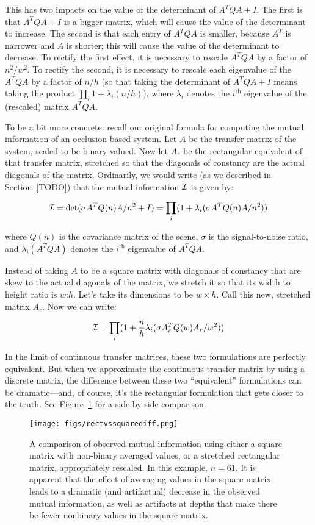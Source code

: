 This has two impacts on the value of the determinant of $A^T Q A + I$. The first is that $A^T Q A + I$ is a bigger matrix, which will cause the value of the determinant to increase. The second is that each entry of $A^T Q A$ is smaller, because $A^T$ is narrower and $A$ is shorter; this will cause the value of the determinant to decrease. To rectify the first effect, it is necessary to rescale $A^T Q A$ by a factor of $n^2/w^2$. To rectify the second, it is necessary to rescale each eigenvalue of the $A^T Q A$ by a factor of $n/h$ (so that taking the determinant of $A^T Q A + I$ means taking the product $\prod_i 1 + \lambda_i (n/h)$), where $\lambda_i$ denotes the $i^{\textrm{th}}$ eigenvalue of the (rescaled) matrix $A^T Q A$.

To be a bit more concrete: recall our original formula for computing the mutual information of an occlusion-based system. Let $A$ be the transfer matrix of the system, scaled to be binary-valued. Now let $A_r$ be the rectangular equivalent of that transfer matrix, stretched so that the diagonals of constancy are the actual diagonals of the matrix. Ordinarily, we would write (as we described in Section~\ref{TODO}) that the mutual information $\mathcal{I}$ is given by:

$$\mathcal{I} = \det(\sigma A^T Q(n) A/n^2 + I) = \prod_i (1 + \lambda_i(\sigma A^T Q(n) A/n^2))$$

where $Q(n)$ is the covariance matrix of the scene, $\sigma$ is the signal-to-noise ratio, and $\lambda_i(A^T Q A)$ denotes the $i^\textrm{th}$ eigenvalue of $A^T Q A$.

Instead of taking $A$ to be a square matrix with diagonals of constancy that are skew to the actual diagonals of the matrix, we stretch it so that its width to height ratio is $w$:$h$. Let's take its dimensions to be $w \times h$. Call this new, stretched matrix $A_r$. Now we can write:

$$\mathcal{I} = \prod_i (1 + \frac{n}{h}\lambda_i(\sigma A_r^T Q(w) A_r/w^2))$$

In the limit of continuous transfer matrices, these two formulations are perfectly equivalent. But when we approximate the continuous transfer matrix by using a discrete matrix, the difference between these two ``equivalent'' formulations can be dramatic---and, of course, it's the rectangular formulation that gets closer to the truth. See Figure~\ref{fig:rectvssquarediff} for a side-by-side comparison.

\begin{figure}
\begin{center}
\texttt{[image: figs/rectvssquarediff.png]}
\caption{A comparison of observed mutual information using either a square matrix with non-binary averaged values, or a stretched rectangular matrix, appropriately rescaled. In this example, $n=61$. It is apparent that the effect of averaging values in the square matrix leads to a dramatic (and artifactual) decrease in the observed mutual information, as well as artifacts at depths that make there be fewer nonbinary values in the square matrix. \label{fig:rectvssquarediff}}
\end{center}
\end{figure}

